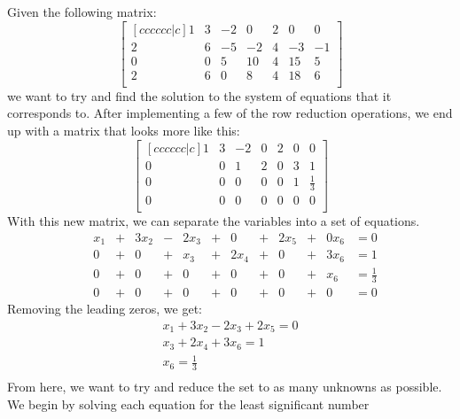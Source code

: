 \begin{exmp}
    Given the following matrix:
    \begin{equation*}
        \begin{bmatrix}[cccccc|c]
            1 & 3 & -2 &  0 & 2 &  0 &  0 \\
            2 & 6 & -5 & -2 & 4 & -3 & -1 \\
            0 & 0 &  5 & 10 & 4 & 15 &  5 \\
            2 & 6 &  0 &  8 & 4 & 18 &  6 \\
        \end{bmatrix}
    \end{equation*}
    we want to try and find the solution to the system of equations that it
    corresponds to. After implementing a few of the row reduction
    operations, we end up with a matrix that looks more like this:
    \begin{equation*}
        \begin{bmatrix}[cccccc|c]
            1 & 3 & -2 &  0 & 2 &  0 &  0           \\
            0 & 0 &  1 &  2 & 0 &  3 &  1           \\
            0 & 0 &  0 &  0 & 0 &  1 &  \frac{1}{3} \\
            0 & 0 &  0 &  0 & 0 &  0 &  0           \\
        \end{bmatrix}
    \end{equation*}
    With this new matrix, we can separate the variables into a set of equations. 
    \begin{align*}
        &x_1 &+ &3x_2 &- &2x_3 &+ &0    &+ &2x_5 &+ &0x_6 &= 0 \\
        &0   &+ &0    &+ &x_3  &+ &2x_4 &+ &0    &+ &3x_6 &= 1 \\
        &0   &+ &0    &+ &0    &+ &0    &+ &0    &+ &x_6  &= \frac{1}{3} \\
        &0   &+ &0    &+ &0    &+ &0    &+ &0    &+ &0    &= 0 
    \end{align*}
    Removing the leading zeros, we get:
    \begin{align*}
        x_1 + 3x_2 - 2x_3 + 2x_5 = 0 \\
        x_3 + 2x_4 + 3x_6 = 1 \\
        x_6 = \frac{1}{3} \\
    \end{align*}
    From here, we want to try and reduce the set to as many unknowns as
    possible. We begin by solving each equation for the least significant number

\end{exmp}
